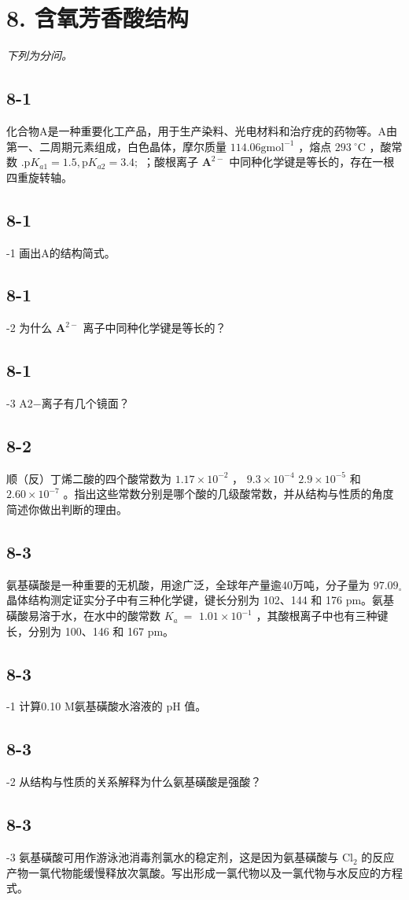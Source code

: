 \section*{8. 含氧芳香酸结构}
\textit{下列为分问。}

\subsection*{8-1}
化合物A是⼀种重要化⼯产品，⽤于⽣产染料、光电材料和治疗疣的药物等。A由第⼀、⼆周期元素组成，⽩⾊晶体，摩尔质量 $1 1 4 . 0 6 \mathrm { g } \mathrm { m o l ^ { - 1 } }$ ，熔点 $2 9 3 \mathrm { ~ } ^ { \circ } \mathrm { C }$ ，酸常数 $\mathrm { . p } K _ { a 1 } = 1 . 5 , \mathrm { p } K _ { a 2 } = 3 . 4 ;$ ；酸根离⼦ $\mathbf { A } ^ { 2 - }$ 中同种化学键是等⻓的，存在⼀根四重旋转轴。

\subsection*{8-1}
-1 画出A的结构简式。

\subsection*{8-1}
-2 为什么 $\mathbf { A } ^ { 2 - }$ 离⼦中同种化学键是等⻓的？

\subsection*{8-1}
-3 A2−离⼦有⼏个镜⾯？

\subsection*{8-2}
顺（反）丁烯⼆酸的四个酸常数为 $1 . 1 7 \times 1 0 ^ { - 2 }$ ， $9 . 3 \times 1 0 ^ { - 4 }$ $2 . 9 \times 1 0 ^ { - 5 }$ 和 $2 . 6 0 \times 1 0 ^ { - 7 }$ 。指出这些常数分别是哪个酸的⼏级酸常数，并从结构与性质的⻆度简述你做出判断的理由。

\subsection*{8-3}
氨基磺酸是⼀种重要的⽆机酸，⽤途⼴泛，全球年产量逾40万吨，分⼦量为 $9 7 . 0 9 _ { \circ }$ 晶体结构测定证实分⼦中有三种化学键，键⻓分别为 102、144 和 176 pm。氨基磺酸易溶于⽔，在⽔中的酸常数 $K _ { a } \ =$ $1 . 0 1 \times 1 0 ^ { - 1 }$ ，其酸根离⼦中也有三种键⻓，分别为 100、146 和 167 pm。

\subsection*{8-3}
-1 计算0.10 M氨基磺酸⽔溶液的 $\mathrm { p H }$ 值。

\subsection*{8-3}
-2 从结构与性质的关系解释为什么氨基磺酸是强酸？

\subsection*{8-3}
-3 氨基磺酸可⽤作游泳池消毒剂氯⽔的稳定剂，这是因为氨基磺酸与 $\mathrm { C l } _ { 2 }$ 的反应产物⼀氯代物能缓慢释放次氯酸。写出形成⼀氯代物以及⼀氯代物与⽔反应的⽅程式。
